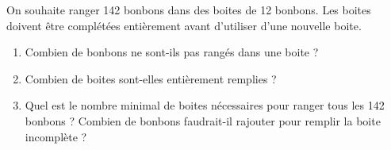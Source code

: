 \documentclass[openany]{book}
\begin{document}

On souhaite ranger 142 bonbons dans des boites de 12 bonbons. Les boites doivent être complétées entièrement avant d'utiliser d'une nouvelle boite. 
\begin{enumerate}
\item Combien de bonbons ne sont-ils pas rangés dans une boite ?
\item Combien de boites sont-elles entièrement remplies ?
\item Quel est le nombre minimal de boites nécessaires pour ranger tous les 142 bonbons ? Combien de bonbons faudrait-il rajouter pour remplir la boite incomplète ? 
\end{enumerate}


\end{document}
